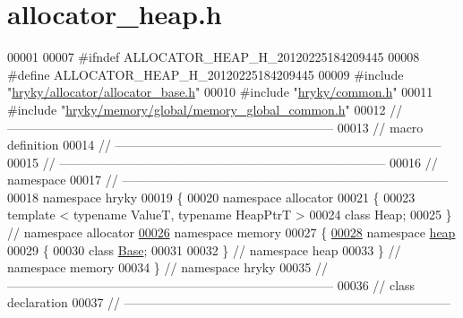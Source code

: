 \hypertarget{allocator__heap_8h_source}{\section{allocator\-\_\-heap.\-h}
}

\begin{DoxyCode}
00001 
00007 \textcolor{preprocessor}{#ifndef ALLOCATOR\_HEAP\_H\_20120225184209445}
00008 \textcolor{preprocessor}{}\textcolor{preprocessor}{#define ALLOCATOR\_HEAP\_H\_20120225184209445}
00009 \textcolor{preprocessor}{}\textcolor{preprocessor}{#include "\hyperlink{allocator__base_8h}{hryky/allocator/allocator_base.h}"}
00010 \textcolor{preprocessor}{#include "\hyperlink{common_8h}{hryky/common.h}"}
00011 \textcolor{preprocessor}{#include "\hyperlink{memory__global__common_8h}{hryky/memory/global/memory_global_common.h}"}
00012 \textcolor{comment}{//
      ------------------------------------------------------------------------------}
00013 \textcolor{comment}{// macro definition}
00014 \textcolor{comment}{//
      ------------------------------------------------------------------------------}
00015 \textcolor{comment}{//
      ------------------------------------------------------------------------------}
00016 \textcolor{comment}{// namespace}
00017 \textcolor{comment}{//
      ------------------------------------------------------------------------------}
00018 \textcolor{keyword}{namespace }hryky
00019 \{
00020 \textcolor{keyword}{namespace }allocator
00021 \{
00023     \textcolor{keyword}{template} < \textcolor{keyword}{typename} ValueT, \textcolor{keyword}{typename} HeapPtrT >
00024     \textcolor{keyword}{class }Heap;
00025 \} \textcolor{comment}{// namespace allocator}
\hypertarget{allocator__heap_8h_source_l00026}{}\hyperlink{namespacehryky_1_1memory}{00026} \textcolor{keyword}{namespace }memory
00027 \{
\hypertarget{allocator__heap_8h_source_l00028}{}\hyperlink{namespacehryky_1_1memory_1_1heap}{00028} \textcolor{keyword}{namespace }\hyperlink{namespacehryky_1_1memory_1_1global_a6fc6103f67c837aa0f39b359588409cd}{heap}
00029 \{
00030     \textcolor{keyword}{class }\hyperlink{classhryky_1_1memory_1_1heap_1_1_base}{Base};
00031     
00032 \} \textcolor{comment}{// namespace heap}
00033 \} \textcolor{comment}{// namespace memory}
00034 \} \textcolor{comment}{// namespace hryky}
00035 \textcolor{comment}{//
      ------------------------------------------------------------------------------}
00036 \textcolor{comment}{// class declaration}
00037 \textcolor{comment}{//
      ------------------------------------------------------------------------------}

\end{DoxyCode}
